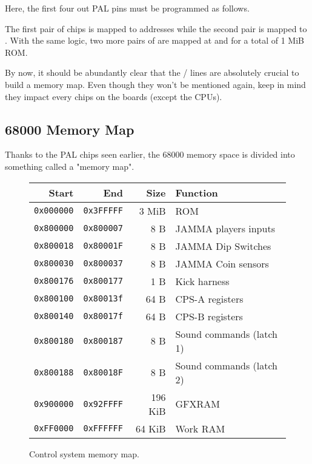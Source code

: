 Here, the first four out PAL pins must be programmed as follows.




The first pair of chips is mapped to addresses  while the second pair is mapped to . With the same logic, two more pairs of  are mapped at  and  for a total of 1 MiB ROM.



By now, it should be abundantly clear that the  /  lines are absolutely crucial to build a memory map. Even though they won't be mentioned again, keep in mind they impact every chips on the boards (except the CPUs).

\subsection{68000 Memory Map}

Thanks to the PAL chips seen earlier, the 68000 memory space is divided into something called a "memory map".

\begin{figure}[H]
{
\begin{tabularx}{\textwidth}{rrrX}
  \textbf{Start } & \textbf{End  } & \textbf{Size } & \textbf{Function } \\               
  \toprule    
  \texttt{0x000000} & \texttt{0x3FFFFF} & 3 MiB & ROM \\
  \toprule    
  \texttt{0x800000} & \texttt{0x800007} & 8 B & JAMMA players inputs \\
  \texttt{0x800018} & \texttt{0x80001F} & 8 B & JAMMA Dip Switches \\
  \texttt{0x800030} & \texttt{0x800037} & 8 B & JAMMA Coin sensors \\
  \texttt{0x800176} & \texttt{0x800177} & 1 B & Kick harness \\
\toprule    
  \texttt{0x800100} & \texttt{0x80013f} & 64 B & CPS-A registers\\
  \texttt{0x800140} & \texttt{0x80017f} & 64 B & CPS-B registers\\
\toprule    
  \texttt{0x800180} & \texttt{0x800187} & 8 B & Sound commands (latch 1)\\
  \texttt{0x800188} & \texttt{0x80018F} & 8 B & Sound commands (latch 2)\\
  \toprule    
  \texttt{0x900000} & \texttt{0x92FFFF} & 196 KiB & GFXRAM\\
  \texttt{0xFF0000} & \texttt{0xFFFFFF} & 64 KiB & Work RAM \\
\end{tabularx}%
}\caption*{Control system memory map.}
\end{figure}

